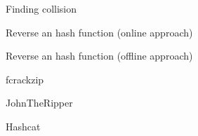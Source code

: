 \begin{frame}{Finding collision}

\end{frame}

\begin{frame}{Reverse an hash function (online approach)}

\end{frame}

\begin{frame}{Reverse an hash function (offline approach)}

\end{frame}

\begin{frame}{fcrackzip}

\end{frame}

\begin{frame}{JohnTheRipper}

\end{frame}

\begin{frame}{Hashcat}

\end{frame}

